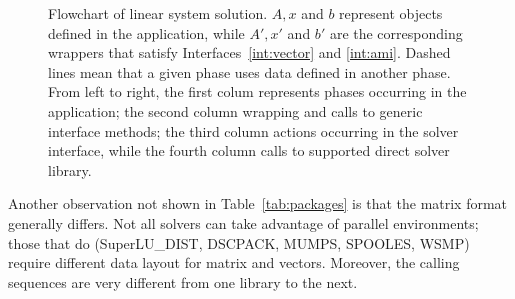 \documentclass[acmtocl]{acmtrans2m}
\begin{document}
\begin{figure}
\begin{center}
\end{center}
\caption{Flowchart of linear system solution. $A, x$ and $b$ represent objects
  defined in the application, while $A', x'$ and $b'$ are the corresponding 
    wrappers that
    satisfy Interfaces~\ref{int:vector} and \ref{int:ami}. Dashed lines mean
    that a given phase uses data defined in another phase. From left to right,
  the first colum 
    represents phases occurring in the application; the second column wrapping
and calls to generic interface methods; the third column actions
occurring in the solver interface, while the fourth column calls to supported
direct solver library.}
\label{fig:flowchart}
\end{figure}

Another observation not shown in Table~\ref{tab:packages} is that the matrix
format generally differs. Not all solvers can take advantage of
parallel environments; those that do 
(SuperLU\_DIST, DSCPACK, MUMPS, SPOOLES, WSMP) require different data layout
for matrix and
vectors. Moreover, the calling sequences are very different from one library
to the next.
\end{document}
